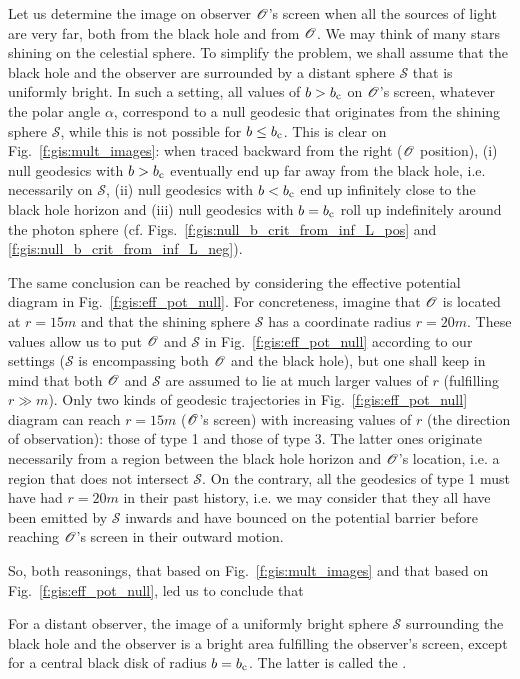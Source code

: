Let us determine the image on observer $\mathscr{O}$'s screen
when all the sources of light are very far, both
from the black hole and from $\mathscr{O}$. We may think of many stars
shining on the celestial sphere. To simplify the problem, we shall assume
that the black hole and the observer are surrounded by a distant
sphere $\mathscr{S}$ that is uniformly bright. In such a setting,
all values of $b > b_{\rm c}$ on $\mathscr{O}$'s screen, whatever the polar angle $\alpha$,
correspond to a null geodesic that originates from the shining sphere $\mathscr{S}$, while
this is not possible for $b \leq b_{\rm c}$.
This is clear on Fig.~\ref{f:gis:mult_images}: when traced backward from the right
($\mathscr{O}$ position), (i) null geodesics with $b > b_{\rm c}$ eventually end
up far away from the black hole, i.e. necessarily on $\mathscr{S}$, (ii) null geodesics
with $b < b_{\rm c}$ end up infinitely close to the black hole horizon
and (iii) null geodesics with $b = b_{\rm c}$ roll up indefinitely around
the photon sphere (cf. Figs.~\ref{f:gis:null_b_crit_from_inf_L_pos} and
\ref{f:gis:null_b_crit_from_inf_L_neg}).

The same conclusion can be reached
by considering the effective potential diagram in Fig.~\ref{f:gis:eff_pot_null}.
For concreteness, imagine that $\mathscr{O}$ is located at $r=15 m$ and that
the shining sphere $\mathscr{S}$ has a coordinate radius $r=20 m$.
These values allow us to put $\mathscr{O}$ and $\mathscr{S}$
in Fig.~\ref{f:gis:eff_pot_null} according
to our settings ($\mathscr{S}$ is encompassing both $\mathscr{O}$ and the black
hole), but one shall keep in mind that both $\mathscr{O}$ and $\mathscr{S}$
are assumed to lie at much larger values of $r$ (fulfilling $r\gg m$).
Only two kinds of geodesic
trajectories in Fig.~\ref{f:gis:eff_pot_null} diagram can reach $r = 15m$ ($\mathscr{O}$'s screen) with increasing values
of $r$ (the direction of observation): those of type 1 and those of type 3.
The latter ones originate necessarily from a region between the black hole
horizon and $\mathscr{O}$'s location, i.e. a region that does not intersect $\mathscr{S}$.
On the contrary, all the geodesics of type 1 must have had $r = 20 m$
in their past history, i.e. we may consider that they all have been emitted
by $\mathscr{S}$ inwards and have bounced on the potential barrier before
reaching $\mathscr{O}$'s screen in their outward motion.

So, both reasonings, that based on Fig.~\ref{f:gis:mult_images} and that
based on Fig.~\ref{f:gis:eff_pot_null}, led us to conclude that
\begin{greybox}
For a distant observer, the image of a uniformly bright sphere $\mathscr{S}$ surrounding
the black hole and the observer is a bright area fulfilling
the observer's screen, except for a central black disk of radius $b=b_{\rm c}$.
The latter is called the
.
\end{greybox}

